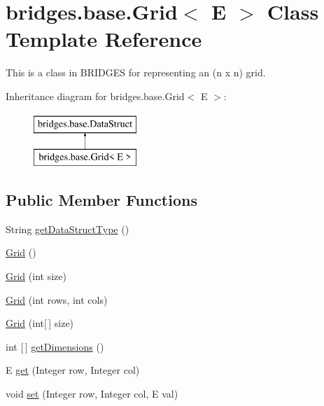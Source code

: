 \hypertarget{classbridges_1_1base_1_1_grid}{}\section{bridges.\+base.\+Grid$<$ E $>$ Class Template Reference}
\label{classbridges_1_1base_1_1_grid}


This is a class in B\+R\+I\+D\+G\+ES for representing an (n x n) grid.  


Inheritance diagram for bridges.\+base.\+Grid$<$ E $>$\+:\begin{figure}[H]
\begin{center}
\leavevmode
\includegraphics[height=2.000000cm]{classbridges_1_1base_1_1_grid}
\end{center}
\end{figure}
\subsection*{Public Member Functions}
\begin{DoxyCompactItemize}
\item 
String \mbox{\hyperlink{classbridges_1_1base_1_1_grid_a81f268dd27c292ff2af9358039d4ebe6}{get\+Data\+Struct\+Type}} ()
\item 
\mbox{\hyperlink{classbridges_1_1base_1_1_grid_aa621ffc958db8341f7ce37ed78944d51}{Grid}} ()
\item 
\mbox{\hyperlink{classbridges_1_1base_1_1_grid_a9818d4959813f1292c6a234bc6f6aa9e}{Grid}} (int size)
\item 
\mbox{\hyperlink{classbridges_1_1base_1_1_grid_a43a699bd7ae2c6c986f978c515ff97d8}{Grid}} (int rows, int cols)
\item 
\mbox{\hyperlink{classbridges_1_1base_1_1_grid_ab9975b28d8dda7f3fbe0e35a7a026772}{Grid}} (int\mbox{[}$\,$\mbox{]} size)
\item 
int \mbox{[}$\,$\mbox{]} \mbox{\hyperlink{classbridges_1_1base_1_1_grid_aee8a5b66095d65ff067a4e76f2611b0e}{get\+Dimensions}} ()
\item 
E \mbox{\hyperlink{classbridges_1_1base_1_1_grid_a698579bb5b7166f76a18a1b04916e090}{get}} (Integer row, Integer col)
\item 
void \mbox{\hyperlink{classbridges_1_1base_1_1_grid_ab79ceb737423bb28ea2348e61a625a17}{set}} (Integer row, Integer col, E val)
\end{DoxyCompactItemize}
